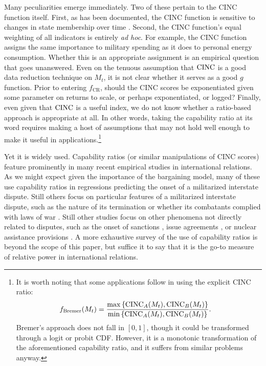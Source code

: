Many peculiarities emerge immediately. 
Two of these pertain to the CINC function itself. 
First, as has been documented, the CINC function is sensitive to changes in state membership over time \citep{organski1980,gleditsch1999,kadera2004}. 
Second, the CINC function's equal weighting of all indicators is entirely \emph{ad hoc}. 
For example, the CINC function assigns the same importance to military spending as it does to personal energy consumption. 
Whether this is an appropriate assignment is an empirical question that goes unanswered. 
Even on the tenuous assumption that $\operatorname{CINC}$ is a good data reduction technique on $M_t$, it is not clear whether it serves as a good $g$ function. 
Prior to entering $f_{\text{CR}}$, should the CINC scores be exponentiated given some parameter on returns to scale, or perhaps exponentiated, or logged? 
Finally, even given that $\operatorname{CINC}$ is a useful index, we do not know whether a ratio-based approach is appropriate at all. 
In other words, taking the capability ratio at its word requires making a host of assumptions that may not hold well enough to make it useful in applications.\footnote{
  It is worth noting that some applications follow \citet{bremer1992} in using the explicit CINC ratio:
  \begin{align*}
    f_{\text{Bremer}}(M_t) &= \frac{\max\left\{\operatorname{CINC}_A(M_t),\operatorname{CINC}_B(M_t)\right\}}{\min\left\{\operatorname{CINC}_A(M_t),\operatorname{CINC}_B(M_t)\right\}}.
  \end{align*}
  Bremer's approach does not fall in $[0,1]$, though it could be transformed through a logit or probit CDF. 
  However, it is a monotonic transformation of the aforementioned capability ratio, and it suffers from similar problems anyway.
}

Yet it is widely used. Capability ratios (or similar manipulations of CINC scores) feature prominently in many recent empirical studies in international relations. 
As we might expect given the importance of the bargaining model, many of these \citep[e.g.][]{gartzke2007,salehyan2008} use capability ratios in regressions predicting the onset of a militarized interstate dispute. 
Still others focus on particular features of a militarized interstate dispute, such as the nature of its termination \citep[e.g.][]{beardsley2008} or whether its combatants complied with laws of war \citep[e.g.][]{morrow2007}. 
Still other studies focus on other phenomena not directly related to disputes, such as the onset of sanctions \citep[e.g.][]{whang2013}, issue agreements \citep[e.g.][]{mitchell2007}, or nuclear assistance provisions \citep[e.g.][]{kroenig2009}. 
A more exhaustive survey of the use of capability ratios is beyond the scope of this paper, but suffice it to say that it is the go-to measure of relative power in international relations.

